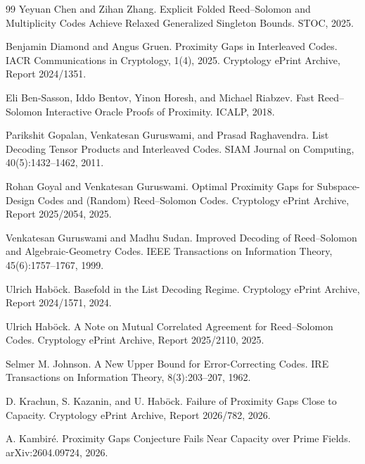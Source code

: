 \documentclass[11pt]{article}
\theoremstyle{definition}
\begin{document}
\begin{thebibliography}{99}
Yeyuan Chen and Zihan Zhang.
\newblock Explicit Folded Reed--Solomon and Multiplicity Codes Achieve Relaxed Generalized Singleton Bounds.
\newblock STOC, 2025.

Benjamin Diamond and Angus Gruen.
\newblock Proximity Gaps in Interleaved Codes.
\newblock IACR Communications in Cryptology, 1(4), 2025.  Cryptology ePrint Archive, Report 2024/1351.

Eli Ben-Sasson, Iddo Bentov, Yinon Horesh, and Michael Riabzev.
\newblock Fast Reed--Solomon Interactive Oracle Proofs of Proximity.
\newblock ICALP, 2018.

Parikshit Gopalan, Venkatesan Guruswami, and Prasad Raghavendra.
\newblock List Decoding Tensor Products and Interleaved Codes.
\newblock SIAM Journal on Computing, 40(5):1432--1462, 2011.

Rohan Goyal and Venkatesan Guruswami.
\newblock Optimal Proximity Gaps for Subspace-Design Codes and (Random) Reed--Solomon Codes.
\newblock Cryptology ePrint Archive, Report 2025/2054, 2025.

Venkatesan Guruswami and Madhu Sudan.
\newblock Improved Decoding of Reed--Solomon and Algebraic-Geometry Codes.
\newblock IEEE Transactions on Information Theory, 45(6):1757--1767, 1999.

Ulrich Hab\"ock.
\newblock Basefold in the List Decoding Regime.
\newblock Cryptology ePrint Archive, Report 2024/1571, 2024.

Ulrich Hab\"ock.
\newblock A Note on Mutual Correlated Agreement for Reed--Solomon Codes.
\newblock Cryptology ePrint Archive, Report 2025/2110, 2025.

Selmer M. Johnson.
\newblock A New Upper Bound for Error-Correcting Codes.
\newblock IRE Transactions on Information Theory, 8(3):203--207, 1962.

D. Krachun, S. Kazanin, and U. Hab\"ock.
\newblock Failure of Proximity Gaps Close to Capacity.
\newblock Cryptology ePrint Archive, Report 2026/782, 2026.

A. Kambir\'e.
\newblock Proximity Gaps Conjecture Fails Near Capacity over Prime Fields.
\newblock arXiv:2604.09724, 2026.

\end{thebibliography}
\end{document}
